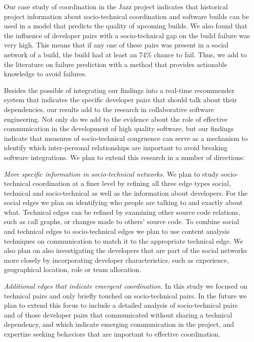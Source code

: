 \documentclass[12pt,oneside]{book}
\begin{document}
Our case study of coordination in the Jazz project indicates that 
historical project information about socio-technical coordination and software
builds can be used in a model that predicts the quality of upcoming builds. We also found
that the influence of developer pairs with a socio-technical gap on the build
failure was very high. This means that if any one of these pairs was present in a
social network of a build, the build had at least an 74\% chance to fail.
Thus, we add to the literature on failure prediction with a method that
provides actionable knowledge to avoid failures. 

Besides the possible of integrating our findings into a real-time recommender system that indicates the specific developer pairs that should talk about their dependencies, our results add to the research in
collaborative software engineering. Not only do we add to the evidence about
the role of effective communication in the development of high quality
software, but our findings indicate that measures of socio-technical congruence can
serve as a mechanism to identify which inter-personal relationships are
important to avoid breaking software integrations. 
%
We plan to extend this research in a number of directions:

\emph{More specific information in socio-technical networks.}
We plan to study socio-technical coordination at a finer level by refining all
three edge types social, technical and socio-technical as well as the
information about developers. For the social edges we plan on identifying who
people are talking to and exactly about what. Technical edges can be refined by examining other source code relations, such as call
graphs, or changes made to others' source code. 
%
To combine social and technical
edges to socio-technical edges we plan to use content analysis techniques on
communication to match it to the appropriate technical edge. We also plan
on also investigating the developers that are part of the social networks more
closely by incorporating developer characteristics, such as experience,
geographical location, role or team allocation.

\emph{Additional edges that indicate emergent coordination.}
In this study we focused on technical pairs and only briefly touched on
socio-technical pairs. In the future we plan to extend this focus to include a
detailed analysis of socio-technical pairs and of those
developer pairs that communicated without sharing a technical dependency, and
which indicate emerging communication in the project, and expertize seeking
behaviors that are important to effective coordination.
\end{document}

